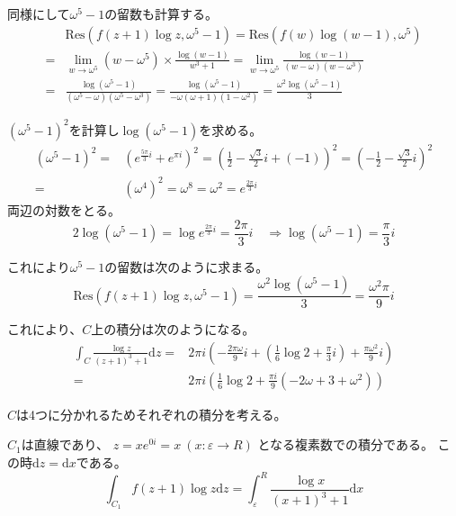 \documentclass[12pt,b5paper]{ltjsarticle}
\begin{document}
同様にして$\omega^5-1$の留数も計算する。
\begin{align}
 & \mathrm{Res}(f(z+1)\log{z},\omega^5-1)
 =
 \mathrm{Res}(f(w)\log{(w-1)},\omega^5)\\
 =&
 \lim_{w\to \omega^5}(w-\omega^5)\times \frac{\log{(w-1)}}{w^3+1}
  =
 \lim_{w\to \omega^5} \frac{\log{(w-1)}}{(w-\omega)(w-\omega^3)}\\
 =&
 \frac{\log{(\omega^5-1)}}{(\omega^5-\omega)(\omega^5-\omega^3)}
 =
 \frac{\log{(\omega^5-1)}}{-\omega(\omega +1)(1-\omega^2)}
 =
 \frac{\omega^2 \log{(\omega^5-1)}}{3}
\end{align}

$(\omega^5-1)^2$を計算し$\log{(\omega^5-1)}$を求める。
\begin{align}
 (\omega^5-1)^2
  =& (e^{\frac{5\pi}{3}i} + e^{\pi i})^2
  = \left( \frac{1}{2}-\frac{\sqrt{3}}{2}i + (-1) \right)^2
  = \left( -\frac{1}{2}-\frac{\sqrt{3}}{2}i \right)^2\\
  =& (\omega^4)^2
  = \omega^8
  = \omega^2
  = e^{\frac{2\pi}{3}i}
\end{align}
両辺の対数をとる。
\begin{equation}
 2\log{(\omega^5-1)}
  = \log{ e^{\frac{2\pi}{3}i} }
  = \frac{2\pi}{3}i
  \quad \Rightarrow
  \log{(\omega^5-1)}
  = \frac{\pi}{3}i
\end{equation}


これにより$\omega^5-1$の留数は次のように求まる。
\begin{equation}
 \mathrm{Res}(f(z+1)\log{z},\omega^5-1)
  =
 \frac{\omega^2\log{(\omega^5-1)}}{3}
  =
 \frac{\omega^2\pi}{9}i
\end{equation}

これにより、$C$上の積分は次のようになる。
\begin{align}
 \int_{C} \frac{\log{z}}{(z+1)^3+1}\mathrm{d}z
  =& 2\pi i \left(
            -\frac{2\pi \omega}{9}i
            + \left(\frac{1}{6}\log{2} + \frac{\pi}{3}i\right)
            + \frac{\pi \omega^2}{9}i
           \right)\\
  =&2\pi i \left(
     \frac{1}{6}\log{2}
     + \frac{\pi i}{9} \left( -2\omega + 3 + \omega^2  \right)
  \right)
\end{align}


$C$は4つに分かれるためそれぞれの積分を考える。

$C_1$は直線であり、
$z=x e^{0i}=x \ (x:\varepsilon \to R)$
となる複素数での積分である。
この時$\mathrm{d}z=\mathrm{d}x$である。
\begin{equation}
 \int_{C_1} f(z+1)\log{z}\mathrm{d}z
  =\int_{\varepsilon}^{R} \frac{\log{x}}{(x+1)^3+1}\mathrm{d}x
\end{equation}
\end{document}
